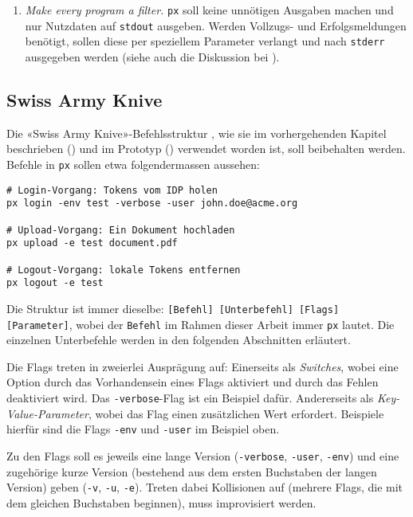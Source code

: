 \begin{enumerate}
    \item \textit{Make every program a filter.} \texttt{px} soll keine unnötigen Ausgaben machen und nur Nutzdaten auf \texttt{stdout} ausgeben. Werden Vollzugs- und Erfolgsmeldungen benötigt, sollen diese per speziellem Parameter verlangt und nach \texttt{stderr} ausgegeben werden (siehe auch die Diskussion bei ).
\end{enumerate}

\subsection{Swiss Army Knive}

Die «Swiss Army Knive»-Befehlsstruktur \cite[S. 290]{gopl}, wie sie im vorhergehenden Kapitel beschrieben () und im Prototyp () verwendet worden ist, soll beibehalten werden. Befehle in \texttt{px} sollen etwa folgendermassen aussehen:

\begin{lstlisting}[caption={Beispielhafter Befehl mit Command, Subcommand, Flags, Parametern}]
# Login-Vorgang: Tokens vom IDP holen
px login -env test -verbose -user john.doe@acme.org

# Upload-Vorgang: Ein Dokument hochladen
px upload -e test document.pdf

# Logout-Vorgang: lokale Tokens entfernen
px logout -e test
\end{lstlisting}

Die Struktur ist immer dieselbe: \texttt{[Befehl] [Unterbefehl] [Flags] [Parameter]}, wobei der \texttt{Befehl} im Rahmen dieser Arbeit immer \texttt{px} lautet. Die einzelnen Unterbefehle werden in den folgenden Abschnitten erläutert.

Die Flags treten in zweierlei Ausprägung auf: Einerseits als \textit{Switches}, wobei eine Option durch das Vorhandensein eines Flags aktiviert und durch das Fehlen deaktiviert wird. Das \texttt{-verbose}-Flag ist ein Beispiel dafür. Andererseits als \textit{Key-Value-Parameter}, wobei das Flag einen zusätzlichen Wert erfordert. Beispiele hierfür sind die Flags \texttt{-env} und \texttt{-user} im Beispiel oben.

Zu den Flags soll es jeweils eine lange Version (\texttt{-verbose}, \texttt{-user}, \texttt{-env}) und eine zugehörige kurze Version (bestehend aus dem ersten Buchstaben der langen Version) geben (\texttt{-v}, \texttt{-u}, \texttt{-e}). Treten dabei Kollisionen auf (mehrere Flags, die mit dem gleichen Buchstaben beginnen), muss improvisiert werden.

